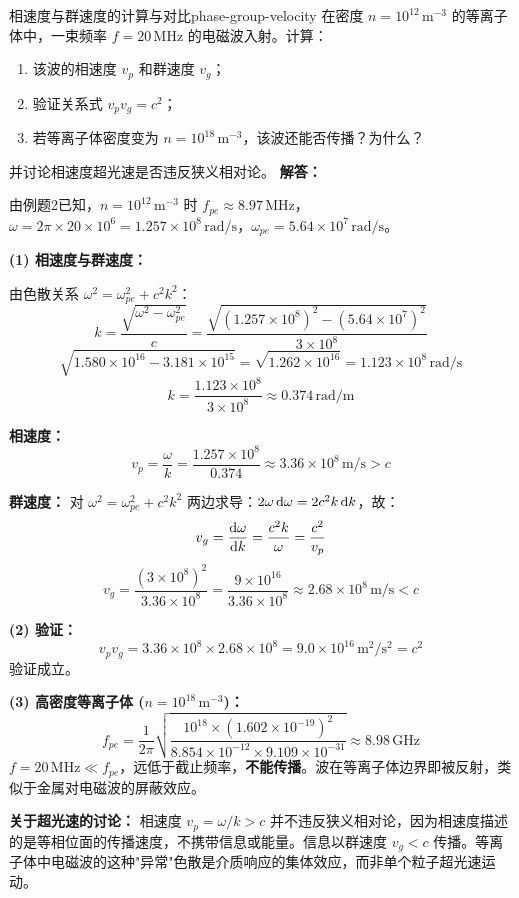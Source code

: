 \begin{example}{相速度与群速度的计算与对比}{phase-group-velocity}
在密度 $n=10^{12}\,\mathrm{m}^{-3}$ 的等离子体中，一束频率 $f=20\,\mathrm{MHz}$ 的电磁波入射。计算：
\begin{enumerate}[label=(\arabic*)]
\item 该波的相速度 $v_p$ 和群速度 $v_g$；
\item 验证关系式 $v_p v_g = c^2$；
\item 若等离子体密度变为 $n=10^{18}\,\mathrm{m}^{-3}$，该波还能否传播？为什么？
\end{enumerate}
并讨论相速度超光速是否违反狭义相对论。
\tcblower
\textbf{解答：}

由例题2已知，$n=10^{12}\,\mathrm{m}^{-3}$ 时 $f_{pe} \approx 8.97\,\mathrm{MHz}$，$\omega = 2\pi\times 20\times 10^6 = 1.257\times 10^8\,\mathrm{rad/s}$，$\omega_{pe} = 5.64\times 10^7\,\mathrm{rad/s}$。

\textbf{(1) 相速度与群速度：}

由色散关系 $\omega^2 = \omega_{pe}^2 + c^2k^2$：
\[
k = \frac{\sqrt{\omega^2 - \omega_{pe}^2}}{c} = \frac{\sqrt{(1.257\times 10^8)^2 - (5.64\times 10^7)^2}}{3\times 10^8}
\]
\[
\sqrt{1.580\times 10^{16} - 3.181\times 10^{15}} = \sqrt{1.262\times 10^{16}} = 1.123\times 10^8\,\mathrm{rad/s}
\]
\[
k = \frac{1.123\times 10^8}{3\times 10^8} \approx 0.374\,\mathrm{rad/m}
\]

\textbf{相速度：}
\[
v_p = \frac{\omega}{k} = \frac{1.257\times 10^8}{0.374} \approx 3.36\times 10^8\,\mathrm{m/s} > c
\]

\textbf{群速度：}
对 $\omega^2 = \omega_{pe}^2 + c^2k^2$ 两边求导：$2\omega\,\mathrm{d}\omega = 2c^2k\,\mathrm{d} k$，故：
\[
v_g = \frac{\mathrm{d}\omega}{\mathrm{d} k} = \frac{c^2k}{\omega} = \frac{c^2}{v_p}
\]
\[
v_g = \frac{(3\times 10^8)^2}{3.36\times 10^8} = \frac{9\times 10^{16}}{3.36\times 10^8} \approx 2.68\times 10^8\,\mathrm{m/s} < c
\]

\textbf{(2) 验证：}
\[
v_p v_g = 3.36\times 10^8\times 2.68\times 10^8 = 9.0\times 10^{16}\,\mathrm{m^2/s^2} = c^2
\]
验证成立。

\textbf{(3) 高密度等离子体 ($n=10^{18}\,\mathrm{m}^{-3}$)：}
\[
f_{pe} = \frac{1}{2\pi}\sqrt{\frac{10^{18}\times (1.602\times 10^{-19})^2}{8.854\times 10^{-12}\times 9.109\times 10^{-31}}} \approx 8.98\,\mathrm{GHz}
\]
$f = 20\,\mathrm{MHz} \ll f_{pe}$，远低于截止频率，\textbf{不能传播}。波在等离子体边界即被反射，类似于金属对电磁波的屏蔽效应。

\textbf{关于超光速的讨论：}
相速度 $v_p = \omega/k > c$ 并不违反狭义相对论，因为相速度描述的是等相位面的传播速度，不携带信息或能量。信息以群速度 $v_g < c$ 传播。等离子体中电磁波的这种"异常"色散是介质响应的集体效应，而非单个粒子超光速运动。
\end{example}

